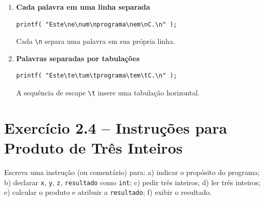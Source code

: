 \documentclass[12pt,a4paper]{article}
\begin{document}
\begin{respostabox}
\begin{enumerate}[label=\textbf{\alph*)}]
\item \textbf{Cada palavra em uma linha separada}
\begin{lstlisting}
printf( "Este\ne\num\nprograma\nem\nC.\n" );
\end{lstlisting}
Cada \texttt{\textbackslash n} separa uma palavra em sua própria linha.

\item \textbf{Palavras separadas por tabulações}
\begin{lstlisting}
printf( "Este\te\tum\tprograma\tem\tC.\n" );
\end{lstlisting}
A sequência de escape \texttt{\textbackslash t} insere uma tabulação horizontal.

\end{enumerate}
\end{respostabox}

\section{Exercício 2.4 -- Instruções para Produto de Três Inteiros}

\begin{enunciadoBox}[Enunciado 2.4]
Escreva uma instrução (ou comentário) para: a) indicar o propósito do programa;
b) declarar \texttt{x}, \texttt{y}, \texttt{z}, \texttt{resultado} como \texttt{int};
c) pedir três inteiros; d) ler três inteiros; e) calcular o produto e atribuir a
\texttt{resultado}; f) exibir o resultado.
\end{enunciadoBox}
\end{document}
